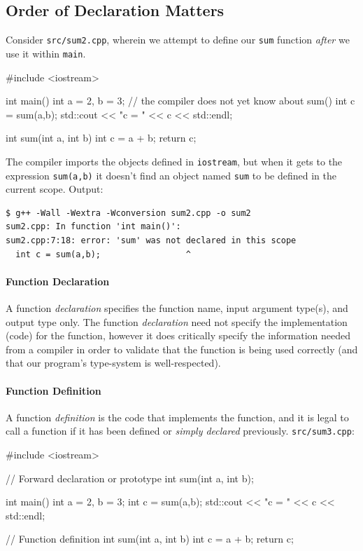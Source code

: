 \documentclass[12pt,letterpaper,twoside]{article}
\begin{document}
\subsection{Order of Declaration Matters}
Consider \texttt{src/sum2.cpp}, wherein we attempt to define our \texttt{sum} function
\emph{after} we use it within \texttt{main}.

\begin{cpp}
#include <iostream>

int main() {
  int a = 2, b = 3;
  // the compiler does not yet know about sum()
  int c = sum(a,b);
  std::cout << "c = " << c << std::endl;
}

int sum(int a, int b) {
  int c = a + b;
  return c;
}
\end{cpp}

The compiler imports the objects defined in \texttt{iostream}, but when it gets
to the expression \texttt{sum(a,b)} it doesn't find an object named \texttt{sum} to be 
defined in the current scope.
Output:

{\small
\begin{verbatim}
$ g++ -Wall -Wextra -Wconversion sum2.cpp -o sum2
sum2.cpp: In function 'int main()':
sum2.cpp:7:18: error: 'sum' was not declared in this scope
  int c = sum(a,b);                 ^
\end{verbatim}
}
\paragraph{Function Declaration}
A function \emph{declaration} specifies the function name, input
argument type(s), and output type only. The function \emph{declaration}
need not specify the implementation (code) for the function, however it does
critically specify the information needed from a compiler in order to validate
that the function is being used correctly (and that our program's type-system is 
well-respected).

\paragraph{Function Definition}
A function \emph{definition} is the code that implements the function, and 
it is legal to call a function if it has been defined or
\emph{simply declared} previously. \texttt{src/sum3.cpp}:

\begin{cpp}
#include <iostream>

// Forward declaration or prototype
int sum(int a, int b);

int main() {
  int a = 2, b = 3;
  int c = sum(a,b);
  std::cout << "c = " << c << std::endl;
}

// Function definition
int sum(int a, int b) {
  int c = a + b;
  return c;
}
\end{cpp}
\end{document}
